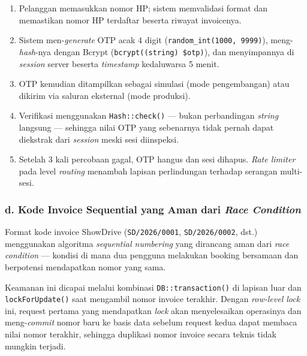 \documentclass[11pt, a5paper]{article}
\begin{document}
\begin{enumerate}[label=\arabic*.]
  \item Pelanggan memasukkan nomor HP; sistem memvalidasi format dan memastikan
        nomor HP terdaftar beserta riwayat invoicenya.
  \item Sistem men-\textit{generate} OTP acak 4 digit
        (\texttt{random\_int(1000, 9999)}), meng-\textit{hash}-nya dengan Bcrypt
        (\texttt{bcrypt((string) \$otp)}), dan menyimpannya di \textit{session}
        server beserta \textit{timestamp} kedaluwarsa 5 menit.
  \item OTP kemudian ditampilkan sebagai simulasi (mode pengembangan) atau
        dikirim via saluran eksternal (mode produksi).
  \item Verifikasi menggunakan \texttt{Hash::check()} — bukan perbandingan
        \textit{string} langsung — sehingga nilai OTP yang sebenarnya tidak
        pernah dapat diekstrak dari \textit{session} meski sesi diinspeksi.
  \item Setelah 3 kali percobaan gagal, OTP hangus dan sesi dihapus.
        \textit{Rate limiter} pada level \textit{routing} menambah lapisan
        perlindungan terhadap serangan multi-sesi.
\end{enumerate}

\subsubsection*{d. Kode Invoice Sequential yang Aman dari \textit{Race Condition}}

Format kode invoice ShowDrive (\texttt{SD/2026/0001}, \texttt{SD/2026/0002},
dst.) menggunakan algoritma \textit{sequential numbering} yang dirancang aman
dari \textit{race condition} — kondisi di mana dua pengguna melakukan booking
bersamaan dan berpotensi mendapatkan nomor yang sama.

Keamanan ini dicapai melalui kombinasi \texttt{DB::transaction()} di lapisan
luar dan \texttt{lockForUpdate()} saat mengambil nomor invoice terakhir. Dengan
\textit{row-level lock} ini, request pertama yang mendapatkan \textit{lock} akan
menyelesaikan operasinya dan meng-\textit{commit} nomor baru ke basis data
sebelum request kedua dapat membaca nilai nomor terakhir, sehingga duplikasi
nomor invoice secara teknis tidak mungkin terjadi.

\newpage

\end{document}
